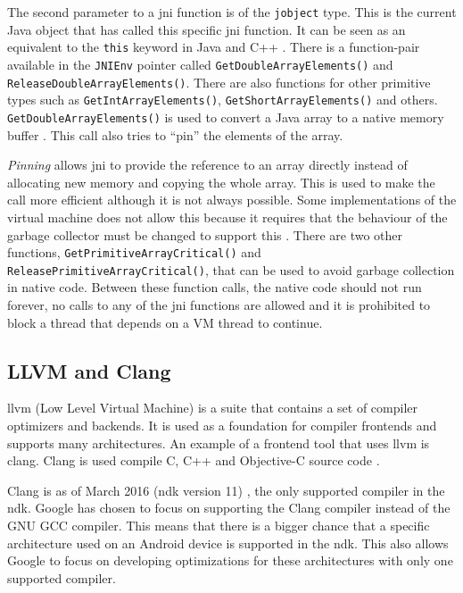 The second parameter to a \gls{jni} function is of the \texttt{jobject} type. This is the current Java object that has called this specific \gls{jni} function. It can be seen as an equivalent to the \texttt{this} keyword in Java and C++ \cite[p.~23]{liang1999java}. There is a function-pair available in the \texttt{JNIEnv} pointer called \texttt{GetDoubleArrayElements()} and \texttt{ReleaseDoubleArrayElements()}. There are also functions for other primitive types such as \texttt{GetIntArrayElements()}, \texttt{GetShortArrayElements()} and others. \texttt{GetDoubleArrayElements()} is used to convert a Java array to a native memory buffer \cite[p.~159]{liang1999java}. This call also tries to \enquote{pin} the elements of the array.

\emph{Pinning} allows \gls{jni} to provide the reference to an array directly instead of allocating new memory and copying the whole array. This is used to make the call more efficient although it is not always possible. Some implementations of the virtual machine does not allow this because it requires that the behaviour of the garbage collector must be changed to support this \cite[p.~158]{liang1999java}. There are two other functions, \texttt{GetPrimitiveArrayCritical()} and \texttt{ReleasePrimitiveArrayCritical()}, that can be used to avoid garbage collection in native code. Between these function calls, the native code should not run forever, no calls to any of the \gls{jni} functions are allowed and it is prohibited to block a thread that depends on a VM thread to continue.

\subsection{LLVM and Clang}
\gls{llvm} (Low Level Virtual Machine) is a suite that contains a set of compiler optimizers and backends. It is used as a foundation for compiler frontends and supports many architectures. An example of a frontend tool that uses \gls{llvm} is \gls{clang}. Clang is used compile C, C++ and Objective-C source code \cite{clang:comp}.

Clang is as of March 2016 (\gls{ndk} version 11) \cite{android:ndk:revision}, the only supported compiler in the \gls{ndk}. Google has chosen to focus on supporting the Clang compiler instead of the GNU GCC compiler. This means that there is a bigger chance that a specific architecture used on an Android device is supported in the \gls{ndk}. This also allows Google to focus on developing optimizations for these architectures with only one supported compiler.

